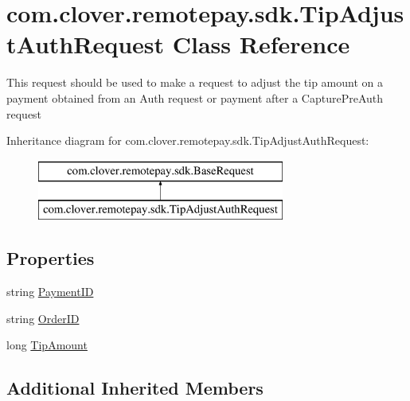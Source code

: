\hypertarget{classcom_1_1clover_1_1remotepay_1_1sdk_1_1_tip_adjust_auth_request}{}\section{com.\+clover.\+remotepay.\+sdk.\+Tip\+Adjust\+Auth\+Request Class Reference}
\label{classcom_1_1clover_1_1remotepay_1_1sdk_1_1_tip_adjust_auth_request}


This request should be used to make a request to adjust the tip amount on a payment obtained from an Auth request or payment after a Capture\+Pre\+Auth request  


Inheritance diagram for com.\+clover.\+remotepay.\+sdk.\+Tip\+Adjust\+Auth\+Request\+:\begin{figure}[H]
\begin{center}
\leavevmode
\includegraphics[height=2.000000cm]{classcom_1_1clover_1_1remotepay_1_1sdk_1_1_tip_adjust_auth_request}
\end{center}
\end{figure}
\subsection*{Properties}
\begin{DoxyCompactItemize}
\item 
string \hyperlink{classcom_1_1clover_1_1remotepay_1_1sdk_1_1_tip_adjust_auth_request_aebec173605e51b5d928c70aa95890d39}{Payment\+ID}
\item 
string \hyperlink{classcom_1_1clover_1_1remotepay_1_1sdk_1_1_tip_adjust_auth_request_abe79bc2f448d63b0c73dd299bb19f39d}{Order\+ID}
\item 
long \hyperlink{classcom_1_1clover_1_1remotepay_1_1sdk_1_1_tip_adjust_auth_request_a60cffdb64e162244a72fe5adb7b6fddd}{Tip\+Amount}
\end{DoxyCompactItemize}
\subsection*{Additional Inherited Members}


